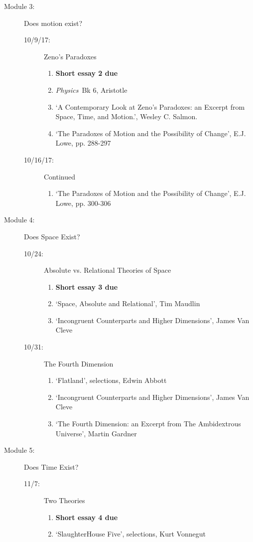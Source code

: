 \documentclass[article,oneside]{memoir}
\begin{document}
\begin{description}
\item[Module 3:] Does motion exist? 
\begin{description}
\item [10/9/17:] Zeno's Paradoxes
\begin{enumerate}
\item \textbf{Short essay 2 due}
\item \emph{Physics}\ Bk 6, Aristotle
\item `A Contemporary Look at Zeno’s Paradoxes: an Excerpt from Space, Time, and Motion.', Wesley C. Salmon. 
\item `The Paradoxes of Motion and the Possibility of Change', E.J. Lowe, pp. 288-297
\end{enumerate}

\item[10/16/17:] Continued
\begin{enumerate}
\item `The Paradoxes of Motion and the Possibility of Change', E.J. Lowe, pp. 300-306
\end{enumerate}
\end{description}

\item[Module 4:] Does Space Exist? 
\begin{description}
\item[10/24:] Absolute vs. Relational Theories of Space
\begin{enumerate}
\item \textbf{Short essay 3 due}
\item `Space, Absolute and Relational', Tim Maudlin
\item `Incongruent Counterparts and Higher Dimensions', James Van Cleve
\end{enumerate}

\item[10/31:] The Fourth Dimension
\begin{enumerate} 
\item `Flatland', selections, Edwin Abbott 
\item `Incongruent Counterparts and Higher Dimensions', James Van Cleve
\item `The Fourth Dimension: an Excerpt from The Ambidextrous Universe', Martin Gardner
\end{enumerate}
\end{description}


\item[Module 5:] Does Time Exist? 
\begin{description}
\item [11/7:] Two Theories
\begin{enumerate}
\item \textbf{Short essay 4 due}
\item `SlaughterHouse Five', selections, Kurt Vonnegut
\end{enumerate}


\end{description}
\end{description}
\end{document}
